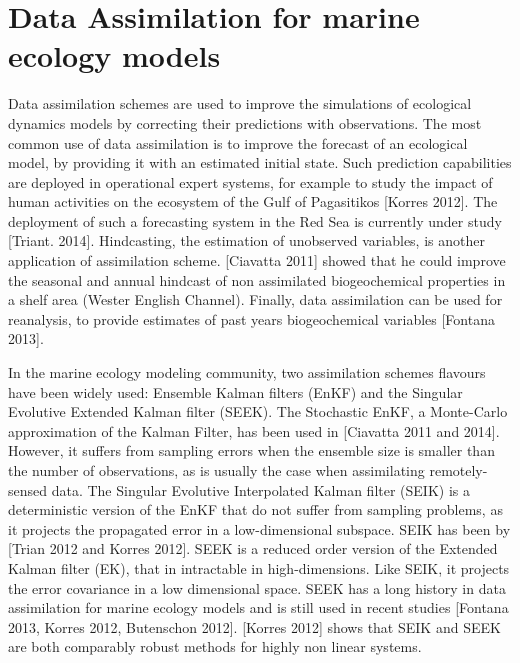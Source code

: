 \section{Data Assimilation for marine ecology models}

Data assimilation schemes are used to improve the simulations of ecological dynamics models by correcting their predictions with observations. The most common use of data assimilation is to improve the forecast of an ecological model, by providing it with an estimated initial state. Such prediction capabilities are deployed in operational expert systems, for example to study the impact of human activities on the ecosystem of the Gulf of Pagasitikos [Korres 2012]. The deployment of such a forecasting system in the Red Sea is currently under study [Triant. 2014]. Hindcasting, the estimation of unobserved variables, is another application of assimilation scheme. [Ciavatta 2011] showed that he could improve the seasonal and annual hindcast of non assimilated biogeochemical properties in a shelf area (Wester English Channel). Finally, data assimilation can be used for reanalysis, to provide estimates of past years biogeochemical variables [Fontana 2013]. 

In the marine ecology modeling community, two assimilation schemes flavours have been widely used: Ensemble Kalman filters (EnKF) and the Singular Evolutive Extended Kalman filter (SEEK). The Stochastic EnKF, a Monte-Carlo approximation of the Kalman Filter, has been used in [Ciavatta 2011 and 2014]. However, it suffers from sampling errors when the ensemble size is smaller than the number of observations, as is usually the case when assimilating remotely-sensed data. The Singular Evolutive Interpolated Kalman filter (SEIK) is a deterministic version of the EnKF that do not suffer from sampling problems, as it projects the propagated error in a low-dimensional subspace. SEIK has been by [Trian 2012 and Korres 2012]. SEEK is a reduced order version of the Extended Kalman filter (EK), that in intractable in high-dimensions. Like SEIK, it projects the error covariance in a low dimensional space. SEEK has a long history in data assimilation for marine ecology models and is still used in recent studies [Fontana 2013, Korres 2012, Butenschon 2012]. [Korres 2012] shows that SEIK and SEEK are both comparably robust methods for highly non linear systems.

